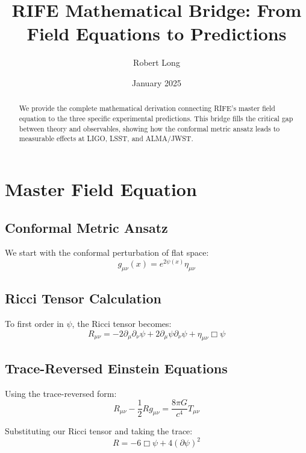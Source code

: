 \documentclass[11pt]{article}
\title{RIFE Mathematical Bridge: From Field Equations to Predictions}
\author{Robert Long}
\date{January 2025}
\begin{document}
\maketitle

\begin{abstract}
We provide the complete mathematical derivation connecting RIFE's master field equation to the three specific experimental predictions. This bridge fills the critical gap between theory and observables, showing how the conformal metric ansatz leads to measurable effects at LIGO, LSST, and ALMA/JWST.
\end{abstract}

\tableofcontents
\clearpage

\section{Master Field Equation}

\subsection{Conformal Metric Ansatz}
We start with the conformal perturbation of flat space:
\begin{equation}
g_{\mu\nu}(x) = e^{2\psi(x)}\eta_{\mu\nu}
\end{equation}

\subsection{Ricci Tensor Calculation}
To first order in $\psi$, the Ricci tensor becomes:
\begin{equation}
R_{\mu\nu} = -2\partial_\mu\partial_\nu\psi + 2\partial_\mu\psi\partial_\nu\psi + \eta_{\mu\nu}\Box\psi
\end{equation}

\subsection{Trace-Reversed Einstein Equations}
Using the trace-reversed form:
\begin{equation}
R_{\mu\nu} - \frac{1}{2}Rg_{\mu\nu} = \frac{8\pi G}{c^4}T_{\mu\nu}
\end{equation}

Substituting our Ricci tensor and taking the trace:
\begin{equation}
R = -6\Box\psi + 4(\partial\psi)^2
\end{equation}
\end{document}
